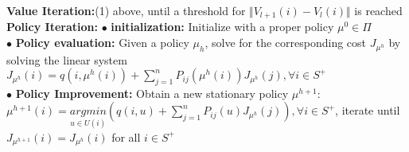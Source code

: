 \documentclass[10pt,landscape]{article}
\begin{document}
\begin{multicols*}{4}
\textbf{Value Iteration:}(1) above, until a threshold for $\Vert V_{l+1}(i) - V_l(i) \Vert$ is reached\\
\textbf{Policy Iteration:}
$\bullet$ \textbf{initialization: }Initialize with a proper policy $\mu^{0} \in \Pi$\\
$\bullet$ \textbf{Policy evaluation: }Given a policy $\mu_h$, solve for the
corresponding cost $J_{\mu^h}$ by solving the linear system\\
$J_{\mu^h}(i) = q(i, \mu^h(i)) + \sum_{j=1}^{n} P_{ij} (\mu^h(i)) J_{\mu^h}(j), \forall i \in S^{+}$\\
$\bullet$ \textbf{Policy Improvement: }
Obtain a new stationary policy $\mu^{h+1}$:\\
$\mu^{h+1}(i) = \underset{u\in U(i)}{argmin} (q(i,u) + \sum_{j=1}^{n} P_{ij}(u) J_{\mu^h}(j)), \forall i \in S^{+}$, iterate until $J_{\mu^{h+1}}(i) = J_{\mu^h}(i)$ for all $i \in S^{+}$\\


\end{multicols*}
\end{document}
